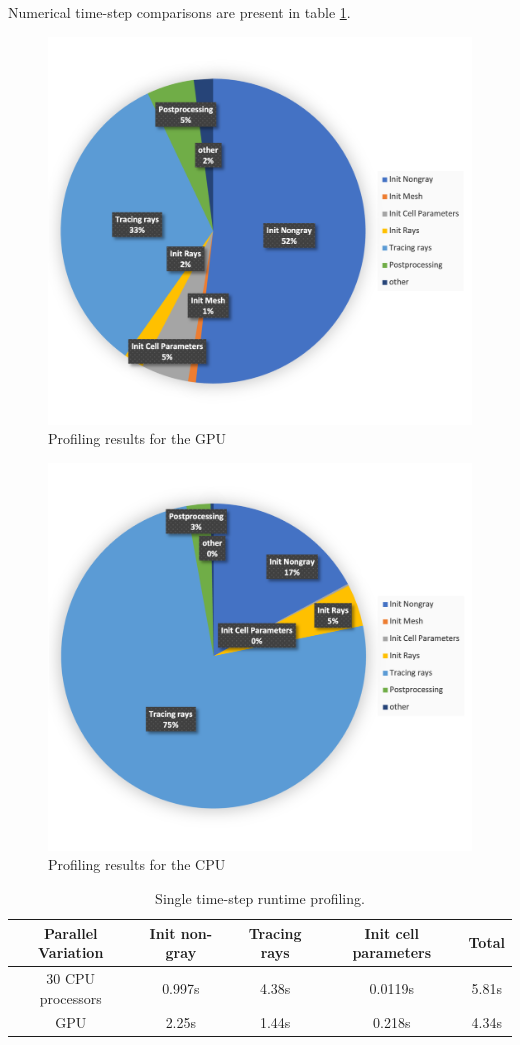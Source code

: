 Numerical time-step comparisons are present in table \ref{table:PoolFireTimestep_runtime_table_1rpc}.

\begin{figure}
\includegraphics[width=0.675\linewidth]{figures/ch4/PoolFire_profiling_OnetimestepGPU.png}
\caption{Profiling results for the GPU}
\label{fig:PoolFire_profiling}
\end{figure}
\begin{figure}
\includegraphics[width=0.675\linewidth]{figures/ch4/PoolFire_profiling_OnetimestepCPU.png}
\caption{Profiling results for the CPU}
\label{fig:PoolFire_profiling_CPU}
\end{figure}

\begin{table}[h!]
\centering
\begin{tabular}{||c c c c c||} 
 \hline
 Parallel Variation & Init non-gray & Tracing rays & Init cell parameters & Total \\ [0.5ex] 
 \hline\hline
 30 CPU processors & 0.997s & 4.38s & 0.0119s & 5.81s \\
 GPU & 2.25s & 1.44s & 0.218s & 4.34s \\ 
 \hline
\end{tabular}
\caption{Single time-step runtime profiling.}
\label{table:PoolFireTimestep_runtime_table_1rpc}
\end{table}


